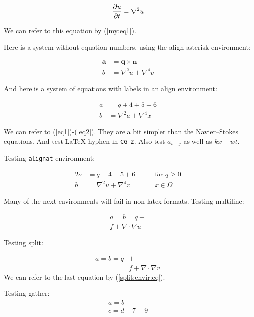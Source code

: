 \documentclass[%
oneside,                 %
final,                   %
10pt]{article}
\theoremstyle{definition}
\begin{document}
\begin{enumerate}
\begin{equation}
{\partial u\over\partial t} = \nabla^2 u \label{my:eq1}
\end{equation}

We can refer to this equation by (\ref{my:eq1}).

Here is a system without equation numbers, using the align-asterisk environment:

\begin{align*}
\pmb{a} &= \pmb{q}\times\pmb{n} \\ 
b &= \nabla^2 u + \nabla^4 v
\end{align*}

And here is a system of equations with labels in an align environment:

\begin{align}
a &= q + 4 + 5+ 6 \label{eq1} \\ 
b &= \nabla^2 u + \nabla^4 x \label{eq2}
\end{align}

We can refer to (\ref{eq1})-(\ref{eq2}). They are a bit simpler than
the Navier--Stokes equations. And test {\LaTeX} hyphen in \texttt{CG-2}.
Also test $a_{i-j}$ as well as $kx-wt$.

Testing \texttt{alignat} environment:

\begin{alignat}{2}
a &= q + 4 + 5+ 6\qquad & \mbox{for } q\geq 0 \label{eq1a} \\ 
b &= \nabla^2 u + \nabla^4 x & x\in\Omega \label{eq2a}
\end{alignat}

Many of the next environments will fail in non-latex formats.
Testing multiline:

\begin{multline}
a = b = q + \\ 
  f + \nabla\cdot\nabla u
\label{multiline:eq1}
\end{multline}

Testing split:

\begin{equation}
\label{split:envir:eq}
\begin{split}
a = b = q &+ \\ 
  & f + \nabla\cdot\nabla u
\end{split}
\end{equation}
We can refer to the last equation by (\ref{split:envir:eq}).

Testing gather:
\begin{gather}
a = b \\ 
c = d + 7 + 9
\end{gather}


\end{enumerate}
\end{document}
